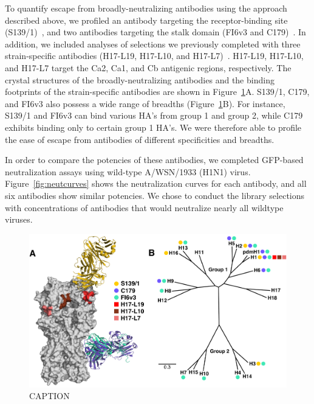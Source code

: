 \documentclass[11pt]{article}
\begin{document}
To quantify escape from broadly-neutralizing antibodies using the approach described above, we profiled an antibody targeting the receptor-binding site (S139/1)~\citep{yoshida2009cross, lee2012heterosubtypic}, and two antibodies targeting the stalk domain (FI6v3 and C179)~\citep{corti2011neutralizing, okuno1993common, dreyfus2013structure}. 
In addition, we included analyses of selections we previously completed with three strain-specific antibodies (H17-L19, H17-L10, and H17-L7)~\citep{doud2017complete}. 
H17-L19, H17-L10, and H17-L7 target the Ca2, Ca1, and Cb antigenic regions, respectively.
The crystal structures of the broadly-neutralizing antibodies and the binding footprints of the strain-specific antibodies are shown in Figure~\ref{fig:antibody_summary}A.
S139/1, C179, and FI6v3 also possess a wide range of breadths (Figure~\ref{fig:antibody_summary}B). 
For instance, S139/1 and FI6v3 can bind various HA's from group 1 and group 2, while C179 exhibits binding only to certain group 1 HA's.
We were therefore able to profile the ease of escape from antibodies of different specificities and breadths.

In order to compare the potencies of these antibodies, we completed GFP-based neutralization assays using wild-type A/WSN/1933 (H1N1) virus. 
Figure~\ref{fig:neutcurves} shows the neutralization curves for each antibody, and all six antibodies show similar potencies.
We chose to conduct the library selections with concentrations of antibodies that would neutralize nearly all wildtype viruses. 


\begin{figure}
\centerline{\includegraphics[width=\textwidth]{figs/antibody_summary_fig/Ab_summary.pdf}}
\caption{\label{fig:antibody_summary}
CAPTION
}
\end{figure}
\end{document}
